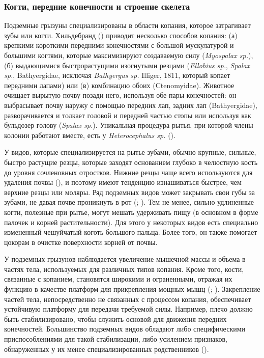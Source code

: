 \subsubsection{Когти, передние конечности и строение скелета}

Подземные грызуны специализированы в области копания, которое затрагивает зубы или когти. Хильдебранд (\cite{Hildebrand1985}) приводит несколько способов копания: (а) крепкими короткими передними конечностями с большой мускулатурой и большими когтями, которые максимизируют создаваемую силу (\textit{Myospalax sp.}), (б) выдающимися быстрорастущими изогнутыми резцами (\textit{Ellobius sp.}, \textit{Spalax sp.}, Bathyergidae, исключая \textit{Bathyergus sp.} Illiger, 1811, который копает передними лапами) или (в) комбинацию обоих (Ctenomyidae). Животное очищает вырытую почву позади него, используя обе пары конечностей: он выбрасывает почву наружу с помощью передних лап, задних лап (Bathyergidae), разворачивается и толкает головой и передней частью стопы или используя как бульдозер голову (\textit{Spalax sp.}). Уникальная процедура рытья, при которой члены колонии работают вместе, есть у \textit{Heterocephalus sp.}  (\cite{Nevo1979}).

У видов, которые специализируется на рытье зубами, обычно крупные, сильные, быстро растущие резцы, которые заходят основанием глубоко в челюстную кость до уровня сочленовных отростков. Нижние резцы чаще всего используются для удаления почвы (\cite{Hildebrand1985}), и поэтому имеют тенденцию изнашиваться быстрее, чем верхние резцы или моляры. Ряд подземных видов может закрывать свои губы за зубами, не давая почве проникнуть в рот (\cite{Nevo1979}; \cite{Hildebrand1985}). Тем не менее, сильно удлиненные когти, полезные при рытье, могут мешать удерживать пищу (в основном в форме палочек и корней растительности). Для этого у некоторых видов есть специально измененный чешуйчатый коготь большого пальца. Более того, он также помогает цокорам в очистке поверхности корней от почвы. 

У подземных грызунов наблюдается увеличение мышечной массы и объема в частях тела, используемых для различных типов копания. Кроме того, кости, связанные с копанием, становятся широкими и ограненными, отражая их функцию в качестве платформ для прикрепления мощных мышц (\cite{Lehmann1963}; \cite{Yalden2009}). Закрепление частей тела, непосредственно не связанных с процессом копания, обеспечивает устойчивую платформу для передачи требуемой силы. Например, плечо должно быть стабилизировано, чтобы служить основой для движения передних конечностей. Большинство подземных видов обладают либо специфическими приспособлениями для такой стабилизации, либо усилением признаков, обнаруженных у их менее специализированных родственников (\cite{Puttick1977}).

